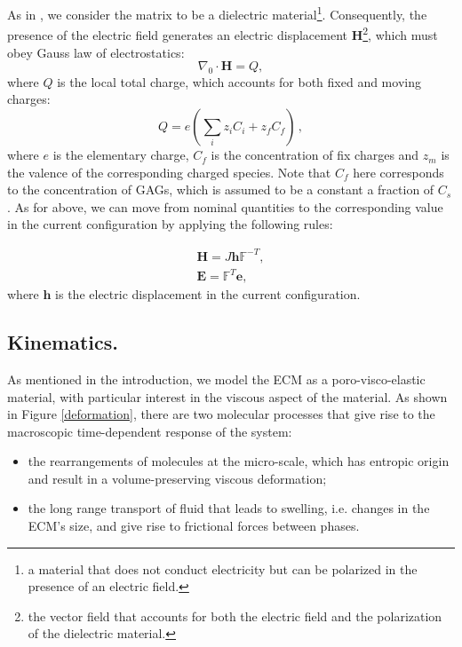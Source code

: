 \documentclass[runningheads]{llncs}
\newcommand{\F}{\ensuremath{\mathbb{F}}}
\begin{document}
As in \cite{Reviewpolyel}, we consider the matrix to be a dielectric material\footnote{a material that does not conduct electricity but can be polarized in the presence of an electric field.}. Consequently, the presence of the electric field generates an electric displacement $\mathbf{H}$\footnote{the vector field that accounts for both the electric field and the polarization of the dielectric material.}, which must obey Gauss law of electrostatics:
\begin{equation}
\nabla_0 \cdot \mathbf{H}= Q,
\label{gauss}
\end{equation}
where $Q$ is the local total charge, which accounts for both fixed and moving charges:
\begin{equation}
Q = e\left(\sum\limits_{i} z_i C_i+z_f C_{f}\right)\, , 
\end{equation}
where $e$ is the elementary charge, $C_f$ is the concentration of fix charges and $z_m$ is the valence of the corresponding charged species. Note that $C_f$ here corresponds to the concentration of GAGs, which is assumed to be a constant a fraction of $C_s$. As for above, we can move from nominal quantities to the corresponding value in the current configuration by applying the following rules:

\begin{eqnarray}
\mathbf{H} = J \mathbf{h}\F^{-T},\\
\mathbf{E} = \F^T \mathbf{e},
\end{eqnarray}
where $\mathbf{h}$ is the electric displacement in the current configuration.

\subsection{Kinematics.}
\label{kin}

As mentioned in the introduction, we model the ECM as a poro-visco-elastic material, with particular interest in the viscous aspect of the material. As shown in Figure \ref{deformation}, there are two molecular processes that give rise to the macroscopic time-dependent response of the system: 
\begin{itemize}
	\item [1.] the rearrangements of molecules at the micro-scale,  which has entropic origin and result in a volume-preserving viscous deformation;
	\item[2.] the long range transport of fluid that leads to swelling, i.e. changes in the ECM's size, and give rise to frictional forces between phases. 
\end{itemize}
\end{document}
